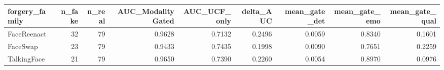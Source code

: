 \begin{tabular}{lrrrrrrrr}
\toprule
forgery_family & n_fake & n_real & AUC_ModalityGated & AUC_UCF_only & delta_AUC & mean_gate_det & mean_gate_emo & mean_gate_qual \\
\midrule
FaceReenact & 32 & 79 & 0.9628 & 0.7132 & 0.2496 & 0.0059 & 0.8340 & 0.1601 \\
FaceSwap & 23 & 79 & 0.9433 & 0.7435 & 0.1998 & 0.0090 & 0.7651 & 0.2259 \\
TalkingFace & 21 & 79 & 0.9650 & 0.7390 & 0.2260 & 0.0054 & 0.8970 & 0.0976 \\
\bottomrule
\end{tabular}
